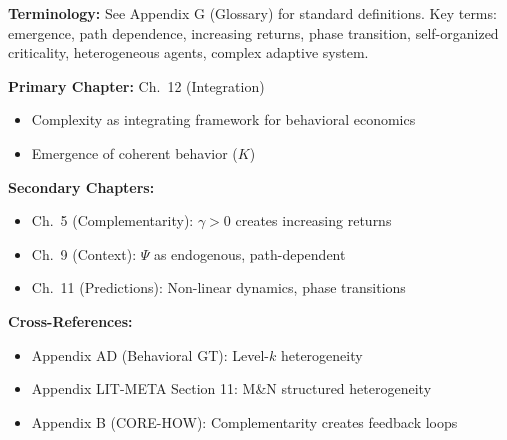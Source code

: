 \begin{tcolorbox}[colback=gray!5!white, colframe=gray!50!black]
\textbf{Terminology:} See Appendix G (Glossary) for standard definitions.
Key terms: emergence, path dependence, increasing returns, phase transition,
self-organized criticality, heterogeneous agents, complex adaptive system.
\end{tcolorbox}

\begin{tcolorbox}[colback=green!5!white, colframe=green!75!black,
    title=\textbf{Chapter References}]

\textbf{Primary Chapter:} Ch.\ 12 (Integration)
\begin{itemize}[nosep]
    \item Complexity as integrating framework for behavioral economics
    \item Emergence of coherent behavior ($K$)
\end{itemize}

\textbf{Secondary Chapters:}
\begin{itemize}[nosep]
    \item Ch.\ 5 (Complementarity): $\gamma > 0$ creates increasing returns
    \item Ch.\ 9 (Context): $\Psi$ as endogenous, path-dependent
    \item Ch.\ 11 (Predictions): Non-linear dynamics, phase transitions
\end{itemize}

\textbf{Cross-References:}
\begin{itemize}[nosep]
    \item Appendix AD (Behavioral GT): Level-$k$ heterogeneity
    \item Appendix LIT-META Section 11: M\&N structured heterogeneity
    \item Appendix B (CORE-HOW): Complementarity creates feedback loops
\end{itemize}

\end{tcolorbox}

